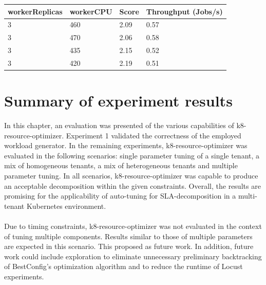 \begin{table}[H]
\begin{tabular}{llll}
\multicolumn{1}{|l|}{\textbf{workerReplicas}} & \multicolumn{1}{l|}{\textbf{workerCPU}} & \multicolumn{1}{l|}{\textbf{Score}} & \multicolumn{1}{l|}{\textbf{Throughput (Jobs/s)}} \\ \hline
\multicolumn{1}{|l|}{3}                       & \multicolumn{1}{l|}{460}                & \multicolumn{1}{l|}{2.09}           & \multicolumn{1}{l|}{0.57}                        \\ \hline
\multicolumn{1}{|l|}{3}                       & \multicolumn{1}{l|}{470}                & \multicolumn{1}{l|}{2.06}           & \multicolumn{1}{l|}{0.58}                        \\ \hline
\multicolumn{1}{|l|}{3}                       & \multicolumn{1}{l|}{435}                & \multicolumn{1}{l|}{2.15}           & \multicolumn{1}{l|}{0.52}                        \\ \hline
\multicolumn{1}{|l|}{3}                       & \multicolumn{1}{l|}{420}                & \multicolumn{1}{l|}{2.19}           & \multicolumn{1}{l|}{0.51}                        \\ \hline
\end{tabular}
\end{table}
\newpage
\section{Summary of experiment results}
In this chapter, an evaluation was presented of the various capabilities of k8-resource-optimizer. Experiment 1 validated the correctness of the employed workload generator. In the remaining experiments, k8-resource-optimizer was evaluated in the following scenarios: single parameter tuning of a single tenant, a mix of homogeneous tenants, a mix of heterogeneous tenants and multiple parameter tuning. In all scenarios, k8-resource-optimizer was capable to produce an acceptable decomposition within the given constraints. Overall, the results are promising for the applicability of auto-tuning for SLA-decomposition in a multi-tenant Kubernetes environment. \\\\
Due to timing constraints, k8-resource-optimizer was not evaluated in the context of tuning multiple components. Results similar to those of multiple parameters are expected in this scenario. This proposed as future work. In addition, future work could include exploration to eliminate unnecessary preliminary backtracking of BestConfig's optimization algorithm and to reduce the runtime of Locust experiments. 

